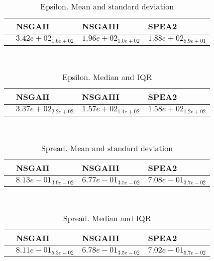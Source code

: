 \documentclass{article}
\begin{document}
\
\begin{table}
\caption{Epsilon. Mean and standard deviation}
\label{table:mean.Epsilon}
\centering
\begin{scriptsize}
\begin{tabular}{llll}
\hline & NSGAII & NSGAIII &  SPEA2\\
\hline
 & $  3.42e+02_{ 1.6e+02}$ & \cellcolor{gray25}$  1.96e+02_{ 1.0e+02}$ & \cellcolor{gray95}$  1.88e+02_{ 8.9e+01}$ \\
\hline
\end{tabular}
\end{scriptsize}
\end{table}
\
\begin{table}
\caption{Epsilon. Median and IQR}
\label{table:median.Epsilon}
\begin{scriptsize}
\centering
\begin{tabular}{llll}
\hline & NSGAII & NSGAIII &  SPEA2\\
\hline
 & $  3.37e+02_{ 2.2e+02}$ & \cellcolor{gray95}$  1.57e+02_{ 1.4e+02}$ & \cellcolor{gray25}$  1.58e+02_{ 1.2e+02}$ \\
\hline
\end{tabular}
\end{scriptsize}
\end{table}
\
\begin{table}
\caption{Spread. Mean and standard deviation}
\label{table:mean.Spread}
\centering
\begin{scriptsize}
\begin{tabular}{llll}
\hline & NSGAII & NSGAIII &  SPEA2\\
\hline
 & $  8.13e-01_{ 3.9e-02}$ & \cellcolor{gray95}$  6.77e-01_{ 3.5e-02}$ & \cellcolor{gray25}$  7.08e-01_{ 3.7e-02}$ \\
\hline
\end{tabular}
\end{scriptsize}
\end{table}
\
\begin{table}
\caption{Spread. Median and IQR}
\label{table:median.Spread}
\begin{scriptsize}
\centering
\begin{tabular}{llll}
\hline & NSGAII & NSGAIII &  SPEA2\\
\hline
 & $  8.11e-01_{ 5.3e-02}$ & \cellcolor{gray95}$  6.78e-01_{ 3.5e-02}$ & \cellcolor{gray25}$  7.02e-01_{ 5.7e-02}$ \\
\hline
\end{tabular}
\end{scriptsize}
\end{table}
\end{document}

